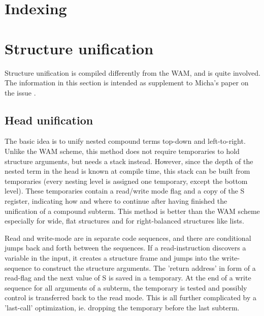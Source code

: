 \section{Indexing}

\section{Structure unification}
Structure unification is compiled differently from the WAM, and is
quite involved. The information in this section is intended as
supplement to Micha's paper on the issue \cite{compnd}.

\subsection{Head unification}
   The basic idea is to unify nested compound terms top-down and
   left-to-right. Unlike the WAM scheme, this method does not require
   temporaries to hold structure arguments, but needs a stack instead.
   However, since the depth of the nested term in the head is known
   at compile time, this stack can be built from temporaries (every
   nesting level is assigned one temporary, except the bottom level).
   These temporaries contain a read/write mode flag and a copy of the
   S register, indicating how and where to continue after having
   finished the unification of a compound subterm.
   This method is better than the WAM scheme especially for wide,
   flat structures and for right-balanced structures like lists.

   Read and write-mode are in separate code sequences, and there
   are conditional jumps back and forth between the sequences.
   If a read-instruction discovers a variable in the input, it
   creates a structure frame and jumps into the write-sequence to
   construct the structure arguments. The 'return address' in form
   of a read-flag and the next value of S is saved in a temporary.
   At the end of a write sequence for all arguments of a subterm,
   the temporary is tested and possibly control is transferred back
   to the read mode. This is all further complicated by a 'last-call'
   optimization, ie. dropping the temporary before the last subterm.

